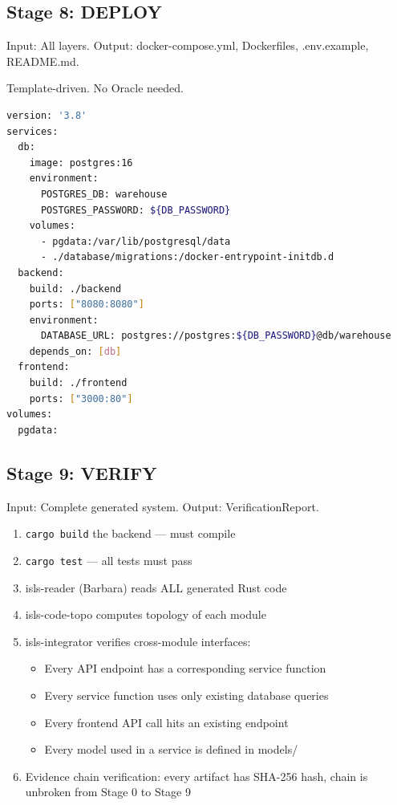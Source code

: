 \documentclass[11pt,a4paper]{article}
\begin{document}
\subsection{Stage 8: DEPLOY}

Input: All layers.
Output: docker-compose.yml, Dockerfiles, .env.example, README.md.

Template-driven. No Oracle needed.

\begin{lstlisting}[language=bash,title=docker-compose.yml (generated)]
version: '3.8'
services:
  db:
    image: postgres:16
    environment:
      POSTGRES_DB: warehouse
      POSTGRES_PASSWORD: ${DB_PASSWORD}
    volumes:
      - pgdata:/var/lib/postgresql/data
      - ./database/migrations:/docker-entrypoint-initdb.d
  backend:
    build: ./backend
    ports: ["8080:8080"]
    environment:
      DATABASE_URL: postgres://postgres:${DB_PASSWORD}@db/warehouse
    depends_on: [db]
  frontend:
    build: ./frontend
    ports: ["3000:80"]
volumes:
  pgdata:
\end{lstlisting}

\subsection{Stage 9: VERIFY}

Input: Complete generated system.
Output: VerificationReport.

\begin{enumerate}
\item \texttt{cargo build} the backend --- must compile
\item \texttt{cargo test} --- all tests must pass
\item isls-reader (Barbara) reads ALL generated Rust code
\item isls-code-topo computes topology of each module
\item isls-integrator verifies cross-module interfaces:
  \begin{itemize}
  \item Every API endpoint has a corresponding service function
  \item Every service function uses only existing database queries
  \item Every frontend API call hits an existing endpoint
  \item Every model used in a service is defined in models/
  \end{itemize}
\item Evidence chain verification: every artifact has SHA-256 hash,
  chain is unbroken from Stage 0 to Stage 9
\end{enumerate}
\end{document}
